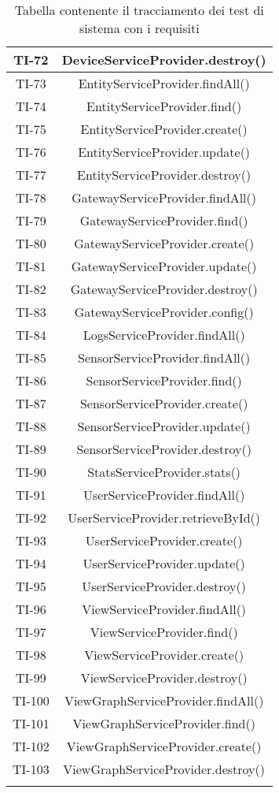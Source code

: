 \begin{center}
\begin{longtable}{|c|c|}
			\hline
			TI-72 & DeviceServiceProvider.destroy() \\
			\hline
			TI-73 & EntityServiceProvider.findAll() \\
			\hline
			TI-74 & EntityServiceProvider.find() \\
			\hline
			TI-75 & EntityServiceProvider.create() \\
			\hline
			TI-76 & EntityServiceProvider.update() \\
			\hline
			TI-77 & EntityServiceProvider.destroy() \\
			\hline
			TI-78 & GatewayServiceProvider.findAll() \\
			\hline
			TI-79 & GatewayServiceProvider.find() \\
			\hline
			TI-80 & GatewayServiceProvider.create() \\
			\hline
			TI-81 & GatewayServiceProvider.update() \\
			\hline
			TI-82 & GatewayServiceProvider.destroy() \\
			\hline
			TI-83 & GatewayServiceProvider.config() \\
			\hline
			TI-84 & LogsServiceProvider.findAll() \\
			\hline
			TI-85 & SensorServiceProvider.findAll() \\
			\hline
			TI-86 & SensorServiceProvider.find() \\
			\hline
			TI-87 & SensorServiceProvider.create() \\
			\hline
			TI-88 & SensorServiceProvider.update() \\
			\hline
			TI-89 & SensorServiceProvider.destroy() \\
			\hline
			TI-90 & StatsServiceProvider.stats() \\
			\hline
			TI-91 & UserServiceProvider.findAll() \\
			\hline
			TI-92 & UserServiceProvider.retrieveById() \\
			\hline
			TI-93 & UserServiceProvider.create() \\
			\hline
			TI-94 & UserServiceProvider.update() \\
			\hline
			TI-95 & UserServiceProvider.destroy() \\
			\hline
			TI-96 & ViewServiceProvider.findAll() \\
			\hline
			TI-97 & ViewServiceProvider.find() \\
			\hline
			TI-98 & ViewServiceProvider.create() \\
			\hline
			TI-99 & ViewServiceProvider.destroy() \\
			\hline
			TI-100 & ViewGraphServiceProvider.findAll() \\
			\hline
			TI-101 & ViewGraphServiceProvider.find() \\
			\hline
			TI-102 & ViewGraphServiceProvider.create() \\
			\hline
			TI-103 & ViewGraphServiceProvider.destroy() \\
			\hline

			\caption{Tabella contenente il tracciamento dei test di sistema con i requisiti}
			\end{longtable}
		\end{center}

